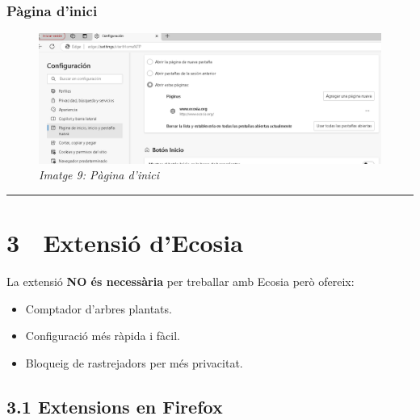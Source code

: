 \documentclass[
  a4paper,
]{article}
\providecommand{\tightlist}{%
  \setlength{\itemsep}{0pt}\setlength{\parskip}{0pt}}
\begin{document}
\subsubsection{Pàgina d'inici}\label{puxe0gina-dinici-2}

\begin{figure}
\centering
\includegraphics{png/2-EdgeInici.png}
\caption{\emph{Imatge 9: Pàgina d'inici}}
\end{figure}

\begin{center}\rule{0.5\linewidth}{0.5pt}\end{center}

\newpage

\section{3 🧩 Extensió d'Ecosia}\label{extensiuxf3-decosia}

La extensió \textbf{NO és necessària} per treballar amb Ecosia però
ofereix:

\begin{itemize}
\tightlist
\item
  Comptador d'arbres plantats.
\item
  Configuració més ràpida i fàcil.
\item
  Bloqueig de rastrejadors per més privacitat.
\end{itemize}

\subsection{3.1 Extensions en Firefox}\label{extensions-en-firefox}
\end{document}
